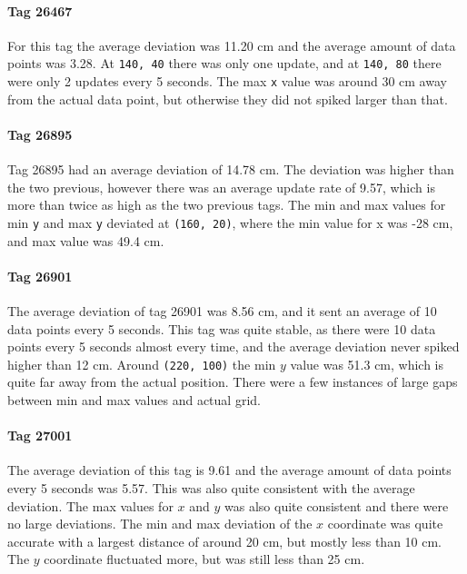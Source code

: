 \paragraph{Tag 26467}
For this tag the average deviation was 11.20 cm and the average amount of data points was 3.28.
At \texttt{140, 40} there was only one update, and at \texttt{140, 80} there were only 2 updates every 5 seconds.
The max \texttt{x} value was around 30 cm away from the actual data point, but otherwise they did not spiked larger than that.

\paragraph{Tag 26895}
Tag 26895 had an average deviation of 14.78 cm. 
The deviation was higher than the two previous, however there was an average update rate of 9.57, which is more than twice as high as the two previous tags.
The min and max values for min \texttt{y} and max \texttt{y} deviated at \texttt{(160, 20)}, where the min value for x was -28 cm, and max value was 49.4 cm.

\paragraph{Tag 26901}
The average deviation of tag 26901 was 8.56 cm, and it sent an average of 10 data points every 5 seconds.
This tag was quite stable, as there were 10 data points every 5 seconds almost every time, and the average deviation never spiked higher than 12 cm.
Around \texttt{(220, 100)} the min $y$ value was 51.3 cm, which is quite far away from the actual position.
There were a few instances of large gaps between min and max values and actual grid.

\paragraph{Tag 27001}
The average deviation of this tag is 9.61 and the average amount of data points every 5 seconds was 5.57.
This was also quite consistent with the average deviation. 
The max values for $x$ and $y$ was also quite consistent and there were no large deviations.
The min and max deviation of the $x$ coordinate was quite accurate with a largest distance of around 20 cm, but mostly less than 10 cm.
The $y$ coordinate fluctuated more, but was still less than 25 cm.

